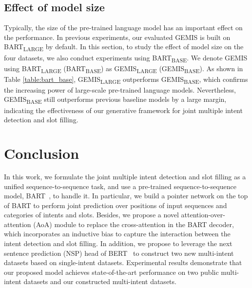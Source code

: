 \documentclass[11pt]{article}
\begin{document}
\subsection{Effect of model size}
Typically, the size of the pre-trained language model has an important effect on the performance. In previous experiments, our evaluated GEMIS is built on BART\textsubscript{LARGE} by default. In this section, to study the effect of model size on the four datasets, we also conduct experiments using BART\textsubscript{BASE}. We denote GEMIS using BART\textsubscript{LARGE} (BART\textsubscript{BASE}) as GEMIS\textsubscript{LARGE} (GEMIS\textsubscript{BASE}). As shown in Table \ref{table:bart_base}, GEMIS\textsubscript{LARGE} outperforms GEMIS\textsubscript{BASE}, which confirms the increasing power of large-scale pre-trained language models. Nevertheless, GEMIS\textsubscript{BASE} still outperforms previous baseline models by a large margin, indicating the effectiveness of our generative framework for joint multiple intent detection and slot filling.

\section{Conclusion}
\label{sec:conclusion}
In this work, we formulate the joint multiple intent detection and slot filling as a unified sequence-to-sequence task, and use a pre-trained sequence-to-sequence model, BART~\cite{DBLP:conf/acl/LewisLGGMLSZ20}, to handle it. In particular, we build a pointer network on the top of BART to perform joint prediction over positions of input sequences and categories of intents and slots. Besides, we propose a novel attention-over-attention (AoA) module to replace the cross-attention in the BART decoder, which incorporates an inductive bias to capture the interaction between the intent detection and slot filling. In addition, we propose to leverage the next sentence prediction (NSP) head of BERT~\cite{DBLP:conf/naacl/DevlinCLT19} to construct two new multi-intent datasets based on single-intent datasets. Experimental results demonstrate that our proposed model achieves state-of-the-art performance on two public multi-intent datasets and our constructed multi-intent datasets.






\appendix
\end{document}
